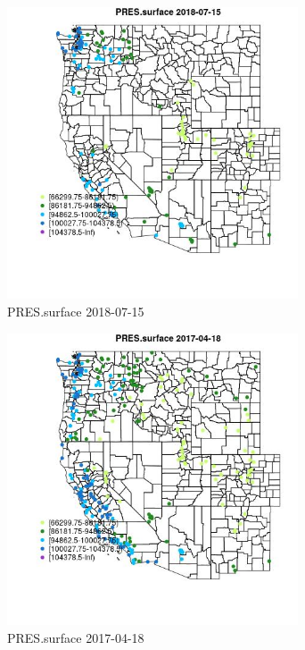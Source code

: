 \begin{figure} 
\centering  
\includegraphics[width=0.77\textwidth]{Code_Outputs/Report_ML_input_PM25_Step4_part_e_de_duplicated_aves_compiled_2019-05-20wNAs_MapObsPRESsurface2018-07-15.jpg} 
\caption{\label{fig:Report_ML_input_PM25_Step4_part_e_de_duplicated_aves_compiled_2019-05-20wNAsMapObsPRESsurface2018-07-15}PRES.surface 2018-07-15} 
\end{figure} 
 

\clearpage 

\begin{figure} 
\centering  
\includegraphics[width=0.77\textwidth]{Code_Outputs/Report_ML_input_PM25_Step4_part_e_de_duplicated_aves_compiled_2019-05-20wNAs_MapObsPRESsurface2017-04-18.jpg} 
\caption{\label{fig:Report_ML_input_PM25_Step4_part_e_de_duplicated_aves_compiled_2019-05-20wNAsMapObsPRESsurface2017-04-18}PRES.surface 2017-04-18} 
\end{figure} 
 

